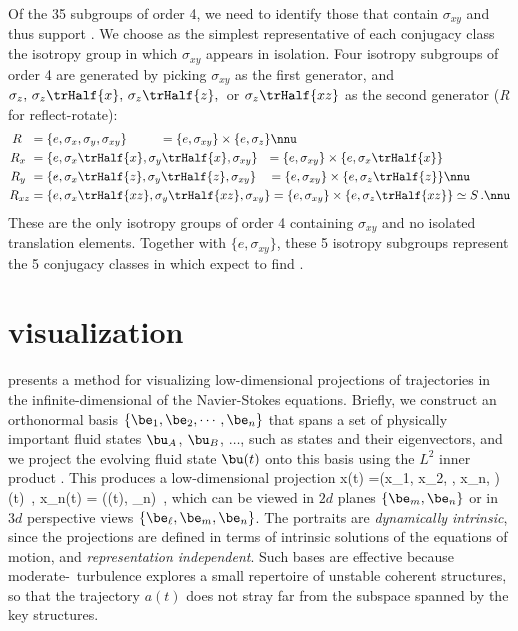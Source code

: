 Of the 35 subgroups of order 4, we need to identify those that
contain $\sigma_{xy}$ and thus support {\eqva}. We choose
as the simplest representative of each conjugacy class the isotropy
group in which $\sigma_{xy}$ appears in isolation.
Four isotropy subgroups of order 4 are generated by picking
$\sigma_{xy}$ as the first generator, and $\sigma_{z},\, \sigma_{z}
\trHalf{x},\, \sigma_{z} \trHalf{z},\,$ or $\sigma_{z} \trHalf{xz}$
as the second generator (\emph{R} for reflect-rotate):
\begin{align}
 R~~  &=  \{e, \sigma_x, \sigma_y, \sigma_{xy}\}
      ~~~~~~~\; = \{e,\sigma_{xy}\} \times \{e,\sigma_{z}\} \nnu\\
 R_x~ &=  \{e,\sigma_x \trHalf{x}, \sigma_y \trHalf{x}, \sigma_{xy}\}
      ~~ = \{e,\sigma_{xy}\} \times \{e,\sigma_{x}\trHalf{x}\}
        \label{subg4RR} \\
 R_y~ &=  \{e, \sigma_x \trHalf{z}, \sigma_y \trHalf{z}, \sigma_{xy}\}
      ~~\; = \{e,\sigma_{xy}\} \times \{e,\sigma_{z}\trHalf{z}\}
        \nnu\\
 R_{xz} &= \{e, \sigma_x \trHalf{xz}, \sigma_y \trHalf{xz}, \sigma_{xy}\}
        = \{e,\sigma_{xy}\} \times \{e,\sigma_{z}\trHalf{xz}\}
        \simeq S \,. \nnu
\end{align}
These are the only isotropy groups of order 4 containing $\sigma_{xy}$
and no isolated translation elements. Together with $\{e,\sigma_{xy}\}$,
these 5 isotropy subgroups represent the 5 conjugacy classes in
which expect to find {\eqva}.


\section{{\StateDsp} visualization}
\label{s:KFvisualStatSp}

 presents a method for visualizing low-dimensional
projections of trajectories in the infinite-dimensional {\statesp} of the
Navier-Stokes equations. Briefly, we construct an orthonormal basis
$\{\be_1, \be_2, \cdots, \be_n\}$ that spans a set of physically
important fluid states $\bu_A$, $\bu_B$, $\dots$, such as {\eqv} states
and their eigenvectors, and we project the evolving fluid state $\bu(t)$
onto this basis using the $L^2$ inner product . This
produces a low-dimensional projection
\beq
x(t) =(x_1, x_2, \cdots, x_n, \cdots)(t)
    \,,\qquad
x_n(t) = (\bu(t), \be_n)
\,,
which can be viewed in $2d$ planes $\{\be_m, \be_n\}$ or in $3d$
perspective views $\{\be_{\ell},\be_m, \be_n\}$. The {\stateDsp}
portraits are {\em dynamically intrinsic}, since the projections are
defined in terms of intrinsic solutions of the equations of motion, and
{\em representation independent}. Such bases are
effective because moderate-\Reynolds\ turbulence explores a small
repertoire of unstable coherent structures, so that the trajectory $a(t)$
does not stray far from the subspace spanned by the key structures.

